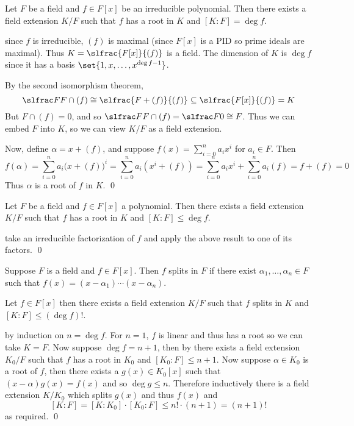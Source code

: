 \bprop

    Let $F$ be a field and $f\in F[x]$ be an irreducible polynomial.
    Then there exists a field extension $K/F$ such that $f$ has a root in $K$ and $[K:F]=\deg f$.

\eprop

\Proof since $f$ is irreducible, $(f)$ is maximal (since $F[x]$ is a PID so prime ideals are maximal).
Thus $K=\slfrac{F[x]}{(f)}$ is a field.
The dimension of $K$ is $\deg f$ since it has a basis $\set{1,x,\dots,x^{\deg f-1}}$.

By the second isomorphism theorem,
$$ \slfrac F{F\cap(f)} \cong \slfrac{F+(f)}{(f)} \subseteq \slfrac{F[x]}{(f)} = K $$
But $F\cap(f)=0$, and so $\slfrac F{F\cap(f)}=\slfrac F{0}\cong F$.
Thus we can embed $F$ into $K$, so we can view $K/F$ as a field extension.

Now, define $\alpha=x+(f)$, and suppose $f(x)=\sum_{i=0}^na_ix^i$ for $a_i\in F$.
Then
$$ f(\alpha) = \sum_{i=0}^na_i\bigl(x+(f)\bigr)^i = \sum_{i=0}^na_i(x^i+(f)) = \sum_{i=0}^na_ix^i + \sum_{i=0}^na_i(f) = f + (f) = 0 $$
Thus $\alpha$ is a root of $f$ in $K$.
\qed

\bcoro[name=polyhasroot]

    Let $F$ be a field and $f\in F[x]$ a polynomial.
    Then there exists a field extension $K/F$ such that $f$ has a root in $K$ and $[K:F]\leq\deg f$.

\ecoro

\Proof take an irreducible factorization of $f$ and apply the above result to one of its factors.
\qed

\bdefn

    Suppose $F$ is a field and $f\in F[x]$.
    Then $f$ {\emphcolor splits} in $F$ if there exist $\alpha_1,\dots,\alpha_n\in F$ such that $f(x)=(x-\alpha_1)\cdots(x-\alpha_n)$.

\edefn

\bprop

    Let $f\in F[x]$ then there exists a field extension $K/F$ such that $f$ splits in $K$ and $[K:F]\leq(\deg f)!$.

\eprop

\Proof by induction on $n=\deg f$.
For $n=1$, $f$ is linear and thus has a root so we can take $K=F$.
Now suppose $\deg f=n+1$, then by  there exists a field extension $K_0/F$ such that $f$ has a root in $K_0$ and $[K_0:F]\leq n+1$.
Now suppose $\alpha\in K_0$ is a root of $f$, then there exists a $g(x)\in K_0[x]$ such that $(x-\alpha)g(x)=f(x)$ and so $\deg g\leq n$.
Therefore inductively there is a field extension $K/K_0$ which splits $g(x)$ and thus $f(x)$ and
$$ [K:F] = [K:K_0]\cdot[K_0:F] \leq n!\cdot(n+1) = (n+1)! $$
as required.
\qed

